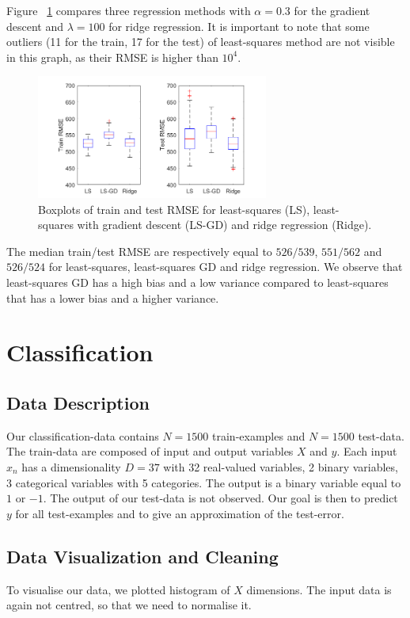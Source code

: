 \documentclass{article} %
\begin{document}
Figure ~\ref{fig:reg_compareMethods} compares three regression methods with $\alpha = 0.3$ for the gradient descent and $\lambda = 100$ for ridge regression. It is important to note that some outliers (11 for the train, 17 for the test) of least-squares method are not visible in this graph, as their RMSE is higher than $10^4$.

\begin{figure}[!h] %
	\center
	\includegraphics[width=3in]{figures/comparisonReg.png}
	\caption{Boxplots of train and test RMSE for least-squares (LS), least-squares with gradient descent (LS-GD) and ridge regression (Ridge).}
	\label{fig:reg_compareMethods}
\end{figure}

The median train/test RMSE are respectively equal to $526/539$, $551/562$ and $526/524$ for least-squares, least-squares GD and ridge regression. We observe that least-squares GD has a high bias and a low variance compared to least-squares that has a lower bias and a higher variance. 

\section{Classification}
\subsection{Data Description}
Our classification-data contains $N=1500$ train-examples and $N=1500$ test-data. The train-data are composed of input and output variables $X$ and $y$. Each input $x_n$ has a dimensionality $D=37$ with 32 real-valued variables, 2 binary variables, 3 categorical variables with 5 categories. The output is a binary variable equal to $1$ or $-1$. The output of our test-data is not observed. Our goal is then to predict $y$ for all test-examples and to give an approximation of the test-error.

\subsection{Data Visualization and Cleaning}
To visualise our data, we plotted histogram of $X$ dimensions. The input data is again not centred, so that we need to normalise it.
\end{document}
